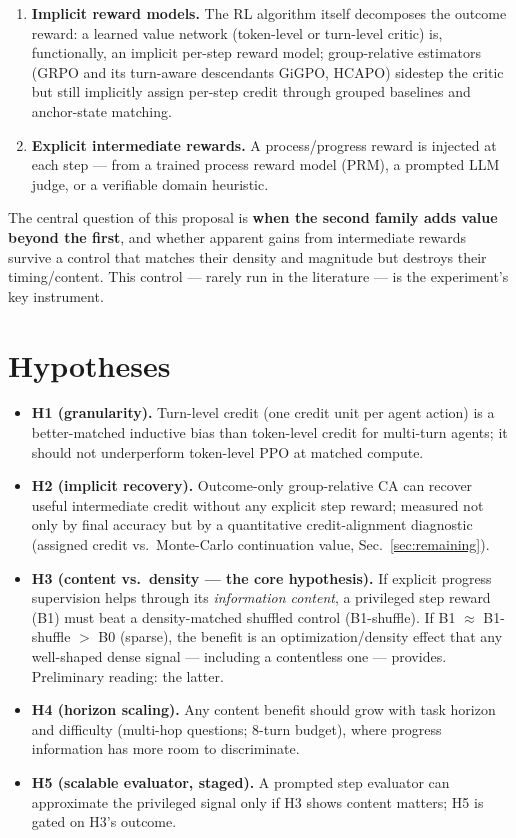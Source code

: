 \documentclass[11pt,a4paper]{article}
\begin{document}
\begin{enumerate}
  \item \textbf{Implicit reward models.} The RL algorithm itself decomposes the outcome reward:
  a learned value network (token-level or turn-level critic) is, functionally, an implicit
  per-step reward model; group-relative estimators (GRPO and its turn-aware descendants GiGPO,
  HCAPO) sidestep the critic but still implicitly assign per-step credit through grouped
  baselines and anchor-state matching.
  \item \textbf{Explicit intermediate rewards.} A process/progress reward is injected at each
  step --- from a trained process reward model (PRM), a prompted LLM judge, or a verifiable
  domain heuristic.
\end{enumerate}

The central question of this proposal is \textbf{when the second family adds value beyond the
first}, and whether apparent gains from intermediate rewards survive a control that matches
their density and magnitude but destroys their timing/content. This control --- rarely run in
the literature --- is the experiment's key instrument.

\section{Hypotheses}

\begin{itemize}
  \item \textbf{H1 (granularity).} Turn-level credit (one credit unit per agent action) is a
  better-matched inductive bias than token-level credit for multi-turn agents; it should not
  underperform token-level PPO at matched compute.
  \item \textbf{H2 (implicit recovery).} Outcome-only group-relative CA can recover useful
  intermediate credit without any explicit step reward; measured not only by final accuracy but
  by a quantitative credit-alignment diagnostic (assigned credit vs.\ Monte-Carlo continuation
  value, Sec.~\ref{sec:remaining}).
  \item \textbf{H3 (content vs.\ density --- the core hypothesis).} If explicit progress
  supervision helps through its \emph{information content}, a privileged step reward (B1) must
  beat a density-matched shuffled control (B1-shuffle). If B1 $\approx$ B1-shuffle $>$ B0
  (sparse), the benefit is an optimization/density effect that any well-shaped dense signal ---
  including a contentless one --- provides. Preliminary reading: the latter.
  \item \textbf{H4 (horizon scaling).} Any content benefit should grow with task horizon and
  difficulty (multi-hop questions; 8-turn budget), where progress information has more room to
  discriminate.
  \item \textbf{H5 (scalable evaluator, staged).} A prompted step evaluator can approximate the
  privileged signal only if H3 shows content matters; H5 is gated on H3's outcome.
\end{itemize}
\end{document}
